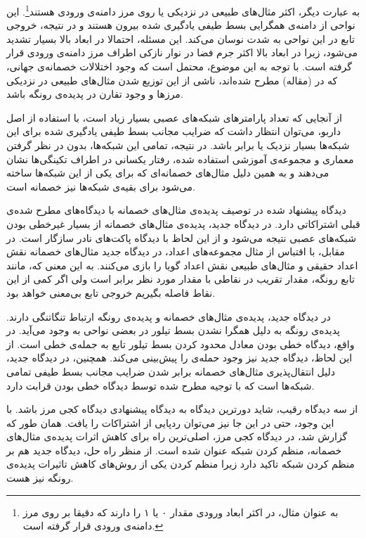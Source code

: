 \documentclass[12pt,onecolumn,a4paper]{article}
\begin{document}
به عبارت دیگر، اکثر مثال‌های طبیعی در نزدیکی یا روی مرز دامنه‌ی ورودی هستند\footnote{به عنوان مثال، در 
اکثر ابعاد ورودی مقدار ۰ یا ۱ را دارند که دقیقا بر روی مرز دامنه‌ی ورودی قرار گرفته است.}.
این نواحی از دامنه‌ی همگرایی بسط طیفی یادگیری شده بیرون هستند و در نتیجه، خروجی تابع در این نواحی به شدت نوسان می‌کند. این مسئله، احتمالا در ابعاد بالا بسیار تشدید می‌شود، زیرا در ابعاد بالا اکثر جرم فضا در نوار نازکی اطراف مرز دامنه‌ی ورودی قرار گرفته است. با توجه به این موضوع، محتمل است که وجود اختلالات خصمانه‌ی جهانی، که در (مقاله) مطرح شده‌اند، ناشی از این توزیع شدن مثال‌های طبیعی در نزدیکی مرزها و وجود تقارن در پدیده‌ی رونگه باشد.

از آنجایی که تعداد پارامترهای شبکه‌های عصبی بسیار زیاد است، با استفاده از اصل داربو، می‌توان انتظار داشت که ضرایب مجانب بسط طیفی یادگیری شده برای این شبکه‌ها بسیار نزدیک یا برابر باشد. در نتیجه، تمامی این شبکه‌ها، بدون در نظر گرفتن معماری و مجموعه‌ی آموزشی استفاده شده، رفتار یکسانی در اطراف تکینگی‌ها نشان می‌دهند و به همین دلیل مثال‌های خصمانه‌ای که برای یکی از این شبکه‌ها ساخته می‌شود برای بقیه‌ی شبکه‌ها نیز خصمانه است.

دیدگاه پیشنهاد شده در توصیف پدیده‌ی مثال‌های خصمانه با دیدگاه‌های مطرح شده‌ی قبلی اشتراکاتی دارد. در دیدگاه جدید، پدیده‌ی مثال‌های خصمانه از بسیار غیرخطی بودن شبکه‌های عصبی نتیجه می‌شود و از این لحاظ با دیدگاه پاکت‌های نادر سازگار است. در مقابل، با اقتباس از مثال مجموعه‌های اعداد، در دیدگاه جدید مثال‌های خصمانه نقش اعداد حقیقی و مثال‌های طبیعی نقش اعداد گویا را بازی می‌کنند. به این معنی که، مانند تابع رونگه، مقدار تقریب در نقاطی با مقدار مورد نظر برابر است ولی اگر کمی از این نقاط فاصله بگیریم خروجی تابع بی‌معنی خواهد بود.

در دیدگاه جدید، پدیده‌ی مثال‌های خصمانه و پدیده‌ی رونگه ارتباط تنگاتنگی دارند. پدیده‌ی رونگه به دلیل همگرا نشدن بسط  تیلور در بعضی نواحی به وجود می‌آید. در واقع، دیدگاه خطی بودن معادل محدود کردن بسط تیلور تابع به جمله‌ی خطی است. از این لحاظ، دیدگاه جدید نیز وجود حمله‌ی
را پیش‌بینی می‌کند. همچنین، در دیدگاه جدید، دلیل انتقال‌پذیری مثال‌های خصمانه برابر شدن ضرایب مجانب بسط طیفی تمامی شبکه‌ها است که با توجیه مطرح شده توسط دیدگاه خطی بودن قرابت دارد.

از سه دیدگاه رقیب، شاید دورترین دیدگاه به دیدگاه پیشنهادی دیدگاه کجی مرز باشد. با این وجود، حتی در این جا نیز می‌توان ردپایی از اشتراکات را یافت. همان طور که گزارش شد، در دیدگاه کجی مرز، اصلی‌ترین راه برای کاهش اثرات پدیده‌ی مثال‌های خصمانه، منظم کردن شبکه عنوان شده است. از منظر راه حل، دیدگاه جدید هم بر منظم کردن شبکه تاکید دارد زیرا منظم کردن یکی از روش‌های کاهش تاثیرات پدیده‌ی رونگه نیز هست.
\end{document}
